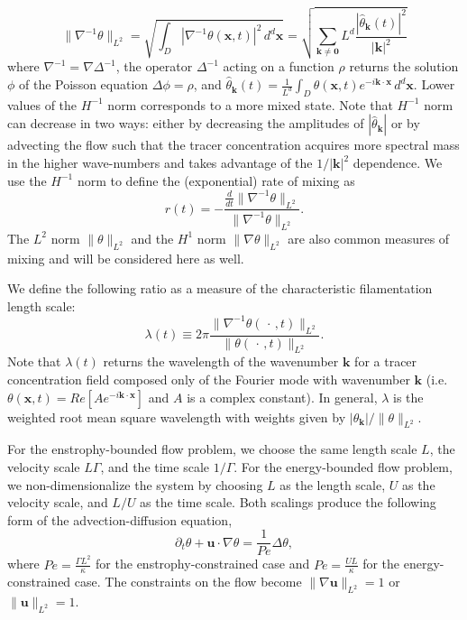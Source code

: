 \documentclass{jfm}
\newcommand{\ddt}[1]{\frac{d #1}{dt}}
\newcommand{\hmone}[1]{\|\nabla^{-1} #1\|_{L^{2}}}
\newcommand{\ltwo}[1]{\|#1\|_{L^{2}}}
\newcommand{\hone}[1]{\| \nabla #1\|_{L^{2}}}
\newcommand{\sint}[1]{\int_{D} #1 \, d^{d}\mathbf{x}}
\renewcommand{\vec}[1]{\mathbf{#1}}
\renewcommand{\u}{\mathbf{u}}
\newcommand{\ppt}[1]{\partial_{t} #1}
\newcommand{\lap}{\Delta }
\begin{document}
\begin{equation}
\hmone{\theta}=\sqrt{\sint{ |\nabla^{-1} \theta( \vec{x},t)|^2}}=\sqrt{ \sum_{\vec{k}\neq \vec{0}} L^d \frac{|\hat{\theta}_{\vec{k}}(t)|^{2}}{|\vec{k}|^2}}
\end{equation}
where $\nabla^{-1}=\nabla \Delta^{-1}$, the operator $\Delta^{-1}$ acting on  a function $\rho$ returns the solution $\phi$ of the Poisson equation $ \Delta \phi = \rho $, and $\hat{\theta}_{\vec{k}}(t) =  \frac{1}{L^{d}}\sint{\theta(\vec{x},t)e^{-i\vec{k}\cdot\vec{x}}}$.  Lower values of the  $H^{-1}$ norm corresponds to a more mixed state. Note that $H^{-1}$ norm can decrease in two ways: either by decreasing the amplitudes of $|\hat{\theta}_{\vec{k}}|$ or by advecting the flow such that the tracer concentration acquires more spectral mass in the higher wave-numbers and takes advantage of the $1/|\vec{k}|^2$ dependence. We use the $H^{-1}$ norm to define the (exponential) rate of mixing as
\begin{equation}
\label{eq:rate}
r(t) = -  \frac{\ddt{}\hmone{\theta}}{\hmone{\theta}}.
\end{equation}
The $L^{2}$ norm $\ltwo{\theta}$ and the $H^{1}$ norm $\hone{\theta}$ are also common measures of mixing and will be considered here as well. 

We define the following ratio as a measure of the characteristic filamentation length scale:
\begin{equation}
\lambda(t)\equiv  2\pi \frac{\|\nabla^{-1}\theta(\,\cdot\,,t)\|_{L^{2}}}{\|\theta(\,\cdot\,,t)\|_{L^{2}}}.
\end{equation}
Note that $\lambda(t)$ returns the wavelength of the wavenumber $\vec{k}$ for a tracer concentration field composed only of the Fourier mode with wavenumber $\vec{k}$ (i.e. $\theta(\vec{x},t) = Re[ A e^{-i\vec{k}\cdot \vec{x}}]$ and $A$ is a complex constant). In general, $\lambda$ is the weighted root mean square wavelength with weights given by $|\theta_{\vec{k}}|/\ltwo{\theta}$. 


For the enstrophy-bounded flow problem, we choose the same length scale $L$, the velocity scale $L\Gamma $, and  the time scale $1/\Gamma$. For the energy-bounded flow problem, we non-dimensionalize the system by choosing $L$ as the length scale, $U$ as the velocity scale, and $L/U$ as the time scale.  Both scalings produce the following form of the advection-diffusion equation,
\begin{equation}
\label{eq:nd_ade}
	\ppt{\theta}+\mathbf{u}\cdot \nabla \theta=\frac{1}{Pe} \lap\theta,
\end{equation}
where $Pe=  \frac{\Gamma L^2}{\kappa}$ for the enstrophy-constrained case and $Pe= \frac{UL}{\kappa}$ for the energy-constrained case.   The constraints on the flow become $\ltwo{\nabla\u} = 1$ or $\ltwo{\u} = 1$.
\end{document}
